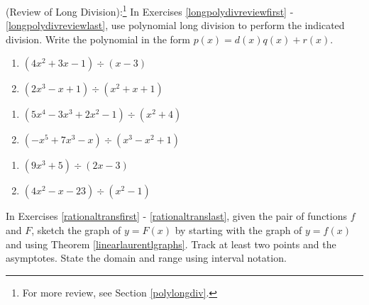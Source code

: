 \documentclass{ximera}
\begin{document}
	\author{Stitz-Zeager}


(Review of Long Division):\footnote{For more review, see Section \ref{polylongdiv}.}  In Exercises \ref{longpolydivreviewfirst} - \ref{longpolydivreviewlast}, use polynomial long division to perform the indicated division.  Write the polynomial in the form $p(x) = d(x)q(x) + r(x)$.

\begin{multicols}{2}
\begin{enumerate}
\item $\left(4x^2+3x-1 \right) \div (x-3)$ \label{longpolydivreviewfirst}
\item $\left(2x^3-x+1 \right) \div \left(x^{2} +x+1 \right)$

\setcounter{HW}{\value{enumi}}
\end{enumerate}
\end{multicols}

\begin{multicols}{2}
\begin{enumerate}
\setcounter{enumi}{\value{HW}}

\item $\left(5x^{4} - 3x^{3} + 2x^{2} - 1 \right) \div \left(x^{2} + 4 \right)$
\item $\left(-x^{5} + 7x^{3} - x \right) \div \left(x^{3} - x^{2} + 1 \right)$

\setcounter{HW}{\value{enumi}}
\end{enumerate}
\end{multicols}

\begin{multicols}{2}
\begin{enumerate}
\setcounter{enumi}{\value{HW}}

\item $\left(9x^{3} + 5 \right) \div \left(2x - 3 \right)$
\item $\left(4x^2 - x - 23 \right) \div \left(x^{2} - 1 \right)$ \label{longpolydivreviewlast}

\setcounter{HW}{\value{enumi}}
\end{enumerate}
\end{multicols}


In Exercises \ref{rationaltransfirst} - \ref{rationaltranslast}, given the pair of functions $f$ and $F$, sketch the graph of $y=F(x)$ by starting with the graph of $y = f(x)$ and using Theorem \ref{linearlaurentlgraphs}.   Track at least two points and the asymptotes.  State the domain and range using interval notation.
\end{document}
